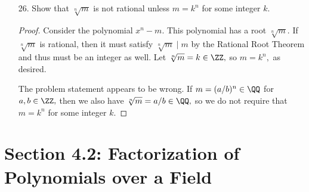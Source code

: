 \documentclass{article}
\begin{document}
\begin{itemize}
	\item[26.] Show that $\sqrt[n]{m}$ is not rational unless $m=k^n$ for some integer $k.$
		\begin{proof}
			Consider the polynomial $x^n-m.$ This polynomial has a root $\sqrt[n]{m}.$ If $\sqrt[n]{m}$ is rational, then it must satisfy $\sqrt[n]{m}\mid m$ by the Rational Root Theorem and thus must be an integer as well. Let $\sqrt[n]{m}=k\in\ZZ,$ so $m=k^n,$ as desired.

			The problem statement appears to be wrong. If $m=(a/b)^n\in \QQ$ for $a, b\in \ZZ,$ then we also have $\sqrt[n]{m}=a/b\in \QQ,$ so we do not require that $m=k^n$ for some integer $k.$
		\end{proof}
		
\end{itemize}

\section*{Section 4.2: Factorization of Polynomials over a Field}
\end{document}

